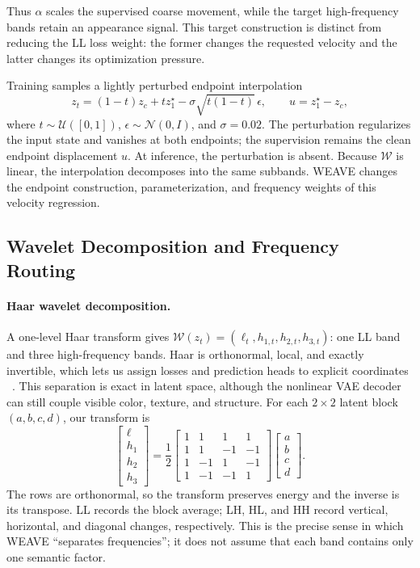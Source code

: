 \documentclass[letterpaper]{article}
\begin{document}
Thus $\alpha$ scales the supervised coarse movement, while the target high-frequency bands
retain an appearance signal. This target construction is distinct from reducing the LL loss
weight: the former changes the requested velocity and the latter changes its optimization
pressure.

Training samples a lightly perturbed endpoint interpolation
\begin{equation}
z_t=(1-t)z_c+t z_1^\star-\sigma\sqrt{t(1-t)}\,\epsilon,\qquad
u=z_1^\star-z_c,
\label{eq:rf-path}
\end{equation}
where $t\sim\mathcal U([0,1])$, $\epsilon\sim\mathcal N(0,I)$, and $\sigma=0.02$.
The perturbation regularizes the input state and vanishes at both endpoints; the supervision
remains the clean endpoint displacement $u$. At inference, the perturbation is absent.
Because $\mathcal W$ is linear, the interpolation decomposes into the same subbands. WEAVE
changes the endpoint construction, parameterization, and frequency weights of this velocity
regression.

\subsection{Wavelet Decomposition and Frequency Routing}
\label{sec:wavelet}

\paragraph{Haar wavelet decomposition.}
A one-level Haar transform gives $\mathcal W(z_t)=(\ell_t,h_{1,t},h_{2,t},h_{3,t})$: one
LL band and three high-frequency bands. Haar is orthonormal, local, and exactly invertible,
which lets us assign losses and prediction heads to explicit coordinates
~\cite{daubechies1992ten}. This separation is exact in latent space, although the nonlinear
VAE decoder can still couple visible color, texture, and structure.
For each $2{\times}2$ latent block $(a,b,c,d)$, our transform is
\begin{equation}
\begin{bmatrix}\ell\\h_1\\h_2\\h_3\end{bmatrix}
=\frac{1}{2}
\begin{bmatrix}
1&1&1&1\\1&1&-1&-1\\1&-1&1&-1\\1&-1&-1&1
\end{bmatrix}
\begin{bmatrix}a\\b\\c\\d\end{bmatrix}.
\label{eq:haar-block}
\end{equation}
The rows are orthonormal, so the transform preserves energy and the inverse is its
transpose. LL records the block average; LH, HL, and HH record vertical, horizontal, and
diagonal changes, respectively. This is the precise sense in which WEAVE ``separates
frequencies''; it does not assume that each band contains only one semantic factor.
\end{document}

